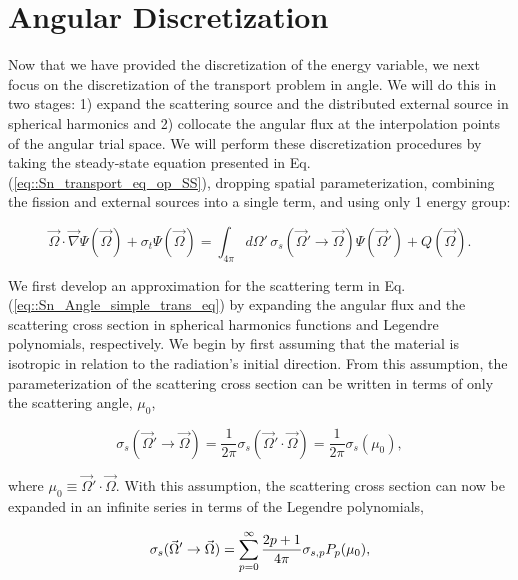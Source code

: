 \section{Angular Discretization}
\label{sec::Sn_Angle}

Now that we have provided the discretization of the energy variable, we next focus on the discretization of the transport problem in angle. We will do this in two stages: 1) expand the scattering source and the distributed external source in spherical harmonics and 2) collocate the angular flux at the interpolation points of the angular trial space. We will perform these discretization procedures by taking the steady-state equation presented in Eq. (\ref{eq::Sn_transport_eq_op_SS}), dropping spatial parameterization, combining the fission and external sources into a single term, and using only 1 energy group:

\begin{equation}
\label{eq::Sn_Angle_simple_trans_eq}
\vec{\Omega} \cdot \vec{\nabla} \Psi (\vec{\Omega}) + \sigma_t \Psi (\vec{\Omega}) = \int_{4 \pi}  d\Omega' \, \sigma_s ( \vec{\Omega}' \rightarrow \vec{\Omega}) \Psi (\vec{\Omega}') + Q  (\vec{\Omega}) .
\end{equation}

We first develop an approximation for the scattering term in Eq. (\ref{eq::Sn_Angle_simple_trans_eq}) by expanding the angular flux and the scattering cross section in spherical harmonics functions and Legendre polynomials, respectively. We begin by first assuming that the material is isotropic in relation to the radiation's initial direction. From this assumption, the parameterization of the scattering cross section can be written in terms of only the scattering angle, $\mu_0$,

\begin{equation}
\label{eq::Sn_scatt_xs}
\sigma_s ( \vec{\Omega}' \rightarrow \vec{\Omega}) = \frac{1}{2 \pi} \sigma_s ( \vec{\Omega}' \cdot \vec{\Omega}) = \frac{1}{2 \pi} \sigma_s ( \mu_0) , 
\end{equation}

\noindent where $\mu_0 \equiv  \vec{\Omega}' \cdot \vec{\Omega}$. With this assumption, the scattering cross section can now be expanded in an infinite series in terms of the Legendre polynomials,

\begin{equation}
\label{eq::Sn_scatt_xs_legendre}
\sigma_s ( \vec{\Omega}' \rightarrow \vec{\Omega}) = \sum\displaylimits_{p=0}^{\infty} \frac{2p + 1}{4 \pi}  \sigma_{s,p} P_p ( \mu_0) , 
\end{equation}


